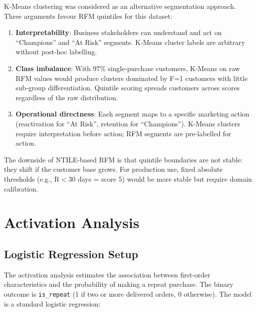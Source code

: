\begin{decisionbox}
K-Means clustering was considered as an alternative segmentation approach.
Three arguments favour RFM quintiles for this dataset:
\begin{enumerate}
  \item \textbf{Interpretability}: Business stakeholders can understand and act
    on ``Champions'' and ``At Risk'' segments. K-Means cluster labels are
    arbitrary without post-hoc labelling.
  \item \textbf{Class imbalance}: With 97\% single-purchase customers, K-Means
    on raw RFM values would produce clusters dominated by F=1 customers with
    little sub-group differentiation. Quintile scoring spreads customers across
    scores regardless of the raw distribution.
  \item \textbf{Operational directness}: Each segment maps to a specific
    marketing action (reactivation for ``At Risk'', retention for ``Champions'').
    K-Means clusters require interpretation before action; RFM segments are
    pre-labelled for action.
\end{enumerate}
The downside of NTILE-based RFM is that quintile boundaries are not stable: they
shift if the customer base grows. For production use, fixed absolute thresholds
(e.g., R$<$30 days = score 5) would be more stable but require domain calibration.
\end{decisionbox}

\section{Activation Analysis}
\label{sec:ecom-activation}


\subsection{Logistic Regression Setup}

The activation analysis estimates the association between first-order
characteristics and the probability of making a repeat purchase. The binary
outcome is \texttt{is\_repeat} (1 if two or more delivered orders, 0 otherwise).
The model is a standard logistic regression:

